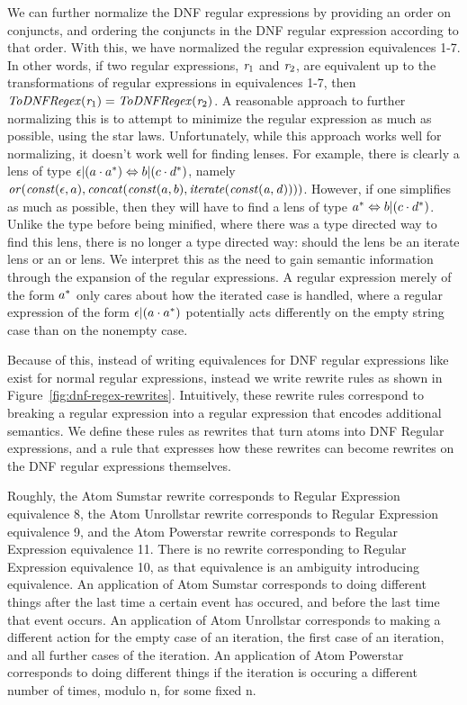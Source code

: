 We can further normalize the DNF regular expressions by providing an order on conjuncts,
and ordering the conjuncts in the DNF regular expression according to that order.
With this, we have normalized the regular expression equivalences 1-7.
In other words, if two regular expressions, $\mathit{r}_1$ and $\mathit{r}_2$,
are equivalent up to the transformations of regular expressions in equivalences 1-7,
then $\mathit{ToDNFRegex}(\mathit{r}_1)=\mathit{ToDNFRegex}(\mathit{r}_2)$.
A reasonable approach to further normalizing this is to attempt to minimize the
regular expression as much as possible, using the star laws.
Unfortunately, while this approach works well for normalizing, it doesn't work
well for finding lenses.  For example, there is clearly a lens of type
$\epsilon|(a\cdot a^*) \Leftrightarrow b|(c\cdot d^*)$,
namely $\mathit{or}(\mathit{const}(\epsilon,a),\mathit{concat}(\mathit{const}(a,b),\mathit{iterate(\mathit{const}(a,d))}))$.
However, if one simplifies as much as possible, then they will have to find a lens
of type $a^* \Leftrightarrow b|(c\cdot d^*)$.
Unlike the type before being minified, where there was a type directed way to find
this lens, there is no longer a type directed way: should the lens be an iterate lens
or an or lens.
We interpret this as the need to gain semantic information through the expansion of
the regular expressions.
A regular expression merely of the form $a^*$ only cares about how the iterated case is handled, where a regular expression of the form
$\epsilon|(a\cdot a^*)$ potentially acts differently on the empty
string case than on the nonempty case.


Because of this, instead of writing equivalences for DNF regular expressions like
exist for normal regular expressions,
instead we write rewrite rules as shown in
Figure~\ref{fig:dnf-regex-rewrites}.
Intuitively, these rewrite rules correspond to breaking a regular expression
into a regular expression that encodes additional semantics.
We define these rules as rewrites that turn atoms into DNF Regular expressions,
and a rule that expresses how these rewrites can become rewrites on
the DNF regular expressions themselves.

Roughly, the Atom Sumstar rewrite corresponds to Regular Expression equivalence 8,
the Atom Unrollstar rewrite corresponds to Regular Expression equivalence 9,
and the Atom Powerstar rewrite corresponds to Regular Expression equivalence 11.
There is no rewrite corresponding to Regular Expression equivalence 10, as that
equivalence is an ambiguity introducing equivalence.
An application of Atom Sumstar corresponds to doing different things after the last time a certain event has occured, and before the last time that event occurs.
An application of Atom Unrollstar corresponds to making a different action for
the empty case of an iteration, the first case of an iteration, and all further cases of the iteration.
An application of Atom Powerstar corresponds to doing different things if the iteration
is occuring a different number of times, modulo n, for some fixed n.

